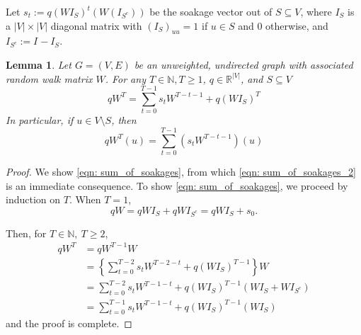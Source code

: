 \documentclass[11pt,twoside]{article}
\newtheorem{lemma}{Lemma}
\newcommand{\abs}[1]{\left \lvert #1 \right \rvert}
\newcommand{\Reals}{\mathbb{R}}
\newcommand{\1}{\mathbf{1}}
\newcommand{\Wbf}{W}
\newcommand{\Ibf}[1]{I_{#1}}
\begin{document}
Let $s_t := q(\Wbf \Ibf{S})^t(\Wbf(\Ibf{S^c}))$ be the soakage vector out of $S \subseteq V$, where $\Ibf{S}$ is a $\abs{V} \times \abs{V}$ diagonal matrix with $(\Ibf{S})_{uu} = 1$ if $u \in S$ and 0 otherwise, and $\Ibf{S^c} := \Ibf{} - \Ibf{S}$. 
\begin{lemma}
	\label{lem: sum_of_soakages}
	Let $G = (V,E)$ be an unweighted, undirected graph with associated random walk matrix $\Wbf$. For any $T \in \mathbb{N}, T \geq 1$, $q \in \Reals^{\abs{V}}$, and $S \subseteq V$
	\begin{equation}
	\label{eqn: sum_of_soakages}
	q\Wbf^T = \sum_{t = 0}^{T - 1} s_t \Wbf^{T - t - 1} + q(\Wbf \Ibf{S})^T
	\end{equation}
	In particular, if $u \in V\setminus S$, then
	\begin{equation}
	\label{eqn: sum_of_soakages_2}
	q\Wbf^T(u) = \sum_{t = 0}^{T - 1} \left(s_t \Wbf^{T - t - 1}\right)(u)
	\end{equation}
\end{lemma}
\begin{proof}	
	We show \eqref{eqn: sum_of_soakages}, from which \eqref{eqn: sum_of_soakages_2} is an immediate consequence.
	To show \eqref{eqn: sum_of_soakages}, we proceed by induction on $T$. When $T = 1$,
	\begin{equation*}
	q\Wbf = q\Wbf\Ibf{S} + q\Wbf\Ibf{S^c} =  q\Wbf\Ibf{S} + s_0. 
	\end{equation*}
	
	Then, for $T \in \mathbb{N},~ T \geq 2$,
	\begin{align*}
	q\Wbf^{T} & = q\Wbf^{T - 1}{\Wbf} \\
	& = \left\{\sum_{t = 0}^{T - 2} s_t \Wbf^{T - 2 - t} + q(\Wbf \Ibf{S})^{T - 1} \right\} \Wbf \tag{by the inductive hypothesis}\\
	& = \sum_{t = 0}^{T - 2} s_t \Wbf^{T - 1 - t} + q(\Wbf \Ibf{S})^{T - 1} (\Wbf \Ibf{S} + \Wbf \Ibf{S^c}) \\
	& = \sum_{t = 0}^{T - 1} s_t \Wbf^{T - 1 - t} + q(\Wbf \Ibf{S})^{T - 1} (\Wbf \Ibf{S})
	\end{align*}
	and the proof is complete.
\end{proof}
\end{document}
